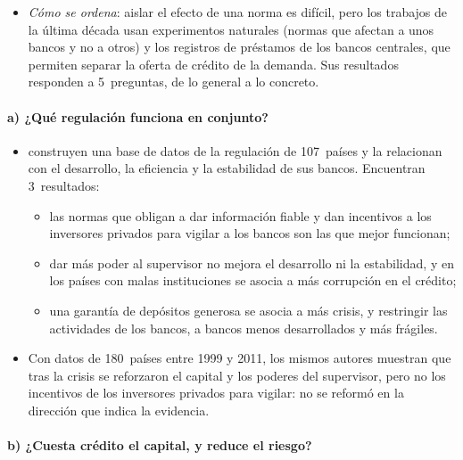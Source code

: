 \documentclass[11pt]{article}
\begin{document}
\begin{itemize}
\item \emph{Cómo se ordena}: aislar el efecto de una norma es difícil, pero los trabajos de la última década usan experimentos naturales (normas que afectan a unos bancos y no a otros) y los registros de préstamos de los bancos centrales, que permiten separar la oferta de crédito de la demanda. Sus resultados responden a 5~preguntas, de lo general a lo concreto.
\end{itemize}

\paragraph{a) ¿Qué regulación funciona en conjunto?}

\begin{itemize}
\item \textcite{BarthCaprioLevine2004} construyen una base de datos de la regulación de 107~países y la relacionan con el desarrollo, la eficiencia y la estabilidad de sus bancos. Encuentran 3~resultados:
  \begin{itemize}
  \item las normas que obligan a dar información fiable y dan incentivos a los inversores privados para vigilar a los bancos son las que mejor funcionan;
  \item dar más poder al supervisor no mejora el desarrollo ni la estabilidad, y en los países con malas instituciones se asocia a más corrupción en el crédito;
  \item una garantía de depósitos generosa se asocia a más crisis, y restringir las actividades de los bancos, a bancos menos desarrollados y más frágiles.
  \end{itemize}
\item Con datos de 180~países entre 1999 y 2011, los mismos autores muestran que tras la crisis se reforzaron el capital y los poderes del supervisor, pero no los incentivos de los inversores privados para vigilar: no se reformó en la dirección que indica la evidencia\nocite{BarthCaprioLevine2013}.
\end{itemize}

\paragraph{b) ¿Cuesta crédito el capital, y reduce el riesgo?}
\end{document}
